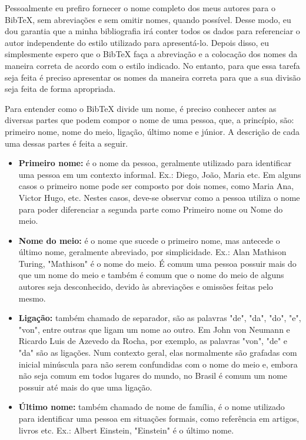 \begin{anexosenv}
Pessoalmente eu prefiro fornecer o nome completo dos meus autores para o BibTeX, sem abreviações e sem omitir nomes, quando possível. Desse modo, eu dou garantia que a minha bibliografia irá conter todos os dados para referenciar o autor independente do estilo utilizado para apresentá-lo. Depois disso, eu simplesmente espero que o BibTeX faça a abreviação e a colocação dos nomes da maneira correta de acordo com o estilo indicado. No entanto, para que essa tarefa seja feita é preciso apresentar os nomes da maneira correta para que a sua divisão seja feita de forma apropriada.

Para entender como o BibTeX divide um nome, é preciso conhecer antes as diversas partes que podem compor o nome de uma pessoa, que, a princípio, são: primeiro nome, nome do meio, ligação, último nome e júnior. A descrição de cada uma dessas partes é feita a seguir.

\begin{itemize}
    \item \textbf{Primeiro nome:} é o nome da pessoa, geralmente utilizado para identificar uma pessoa em um contexto informal. Ex.: Diego, João, Maria etc. Em alguns casos o primeiro nome pode ser composto por dois nomes, como Maria Ana, Victor Hugo, etc. Nestes casos, deve-se observar como a pessoa utiliza o nome para poder diferenciar a segunda parte como Primeiro nome ou Nome do meio.

    \item \textbf{Nome do meio:} é o nome que sucede o primeiro nome, mas antecede o último nome, geralmente abreviado, por simplicidade. Ex.: Alan Mathison Turing, "Mathison"{} é o nome do meio. É comum uma pessoa possuir mais do que um nome do meio e também é comum que o nome do meio de alguns autores seja desconhecido, devido às abreviações e omissões feitas pelo mesmo.

    \item \textbf{Ligação:} também chamado de separador, são as palavras "de"{}, "da"{}, "do"{}, "e"{}, "von"{}, entre outras que ligam um nome ao outro. Em John von Neumann e Ricardo Luis de Azevedo da Rocha, por exemplo, as palavras "von"{}, "de"{}  e "da"{}  são as ligações. Num contexto geral, elas normalmente são grafadas com inicial minúscula para não serem confundidas com o nome do meio e, embora não seja comum em todos lugares do mundo, no Brasil é comum um nome possuir até mais do que uma ligação.

    \item \textbf{Último nome:} também chamado de nome de família, é o nome utilizado para identificar uma pessoa em situações formais, como referência em artigos, livros etc. Ex.: Albert Einstein, "Einstein"{} é o último nome.


\end{itemize}
\end{anexosenv}
